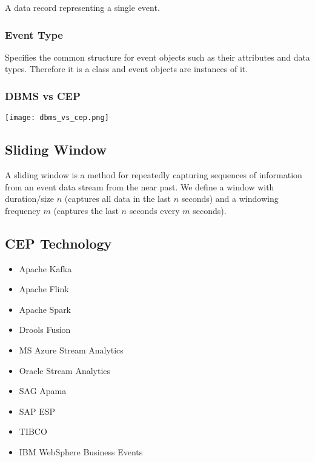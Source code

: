 A data record representing a single event.

\subsubsection*{Event Type}

Specifies the common structure for event objects such as their attributes and data types. Therefore it is a class and event objects are instances of it.

\subsubsection*{DBMS vs CEP}

\texttt{[image: dbms\_vs\_cep.png]}

\subsection{Sliding Window}

A sliding window is a method for repeatedly capturing sequences of information from an event data stream from the near past. We define a window with duration/size $n$ (captures all data in the last $n$ seconds) and a windowing frequency $m$ (captures the last $n$ seconds every $m$ seconds).


\subsection{CEP Technology}

\begin{itemize}
    \item Apache Kafka
    \item Apache Flink
    \item Apache Spark
    \item Drools Fusion
    \item MS Azure Stream Analytics
    \item Oracle Stream Analytics
    \item SAG Apama
    \item SAP ESP
    \item TIBCO
    \item IBM WebSphere Business Events
\end{itemize}

